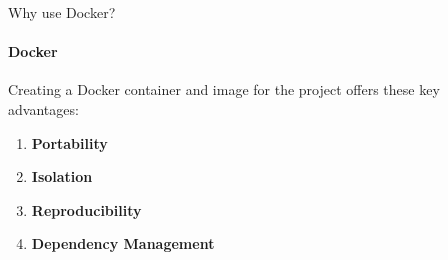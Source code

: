 \documentclass{beamer}
\begin{document}
\begin{frame}[plain]
\begin{center}
\end{center}

\end{frame}
\begin{comment}
    
     Run the project on any platform supporting Docker
     Avoid conflicts with other software on the host system.
     Recreate the exact same environment whenever needed.
     Package all dependencies within the Docker image.
     
\end{comment}
\begin{frame}{Why use Docker?}
\framesubtitle{Docker}
    Creating a Docker container and image for the project offers these key advantages:
    \begin{enumerate}
        \item \textbf{Portability} 
        \item \textbf{Isolation} 
        \item \textbf{Reproducibility} 
        \item \textbf{Dependency Management} 
    \end{enumerate}
\end{frame}
\begin{comment}
     This Dockerfile creates a docker image with Feel++ as a base and installs the dependencies and libraries needed to run ScimBa in that environment.

    
     
\end{comment}
\end{document}
